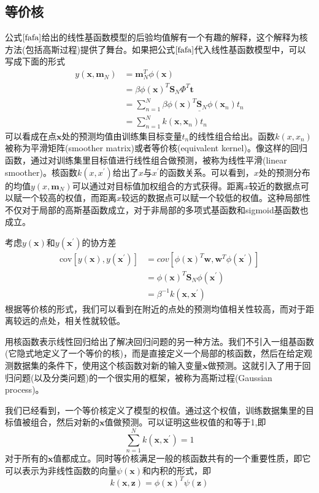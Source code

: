 \subsection*{等价核}
公式$\ref{fafa}$给出的线性基函数模型的后验均值解有一个有趣的解释，这个解释为核方法(包括高斯过程)提供了舞台。如果把公式$\ref{fafa}$代入线性基函数模型中，可以写成下面的形式
\begin{equation}
\begin{aligned}
	y(\boldsymbol{x},\boldsymbol{m}_N)&=\boldsymbol{m}_N^T\phi(\boldsymbol{x})\\
	&=\beta\phi(\boldsymbol{x})^T\boldsymbol{S}_N\Phi^T\boldsymbol{t}\\
	&=\sum_{n=1}^{N}\underline{\beta\phi(\boldsymbol{x})^T\boldsymbol{S}_N\phi(\boldsymbol{x}_n)}t_n\\
	&=\sum_{n=1}^{N}k(\boldsymbol{x},\boldsymbol{x}_n)t_n
\end{aligned}
\end{equation}
可以看成在点$\boldsymbol{x}$处的预测均值由训练集目标变量$t_n$的线性组合给出。函数$k(x,x_n)$被称为平滑矩阵(smoother matrix)或者等价核(equivalent kernel)。像这样的回归函数，通过对训练集里目标值进行线性组合做预测，被称为线性平滑(linear smoother)。核函数$k(x,x^{'})$给出了$x$与$x^{'}$的函数关系。可以看到，$x$处的预测分布的均值$y(x,\boldsymbol{m}_N)$可以通过对目标值加权组合的方式获得。距离$x$较近的数据点可以赋一个较高的权值，而距离$x$较远的数据点可以赋一个较低的权值。这种局部性不仅对于局部的高斯基函数成立，对于非局部的多项式基函数和sigmoid基函数也成立。

考虑$y(\boldsymbol{x})$和$y(\boldsymbol{x^{'}})$的协方差
\begin{equation}
	\begin{aligned}
	\mathrm{cov}[y(\boldsymbol{x}),y(\boldsymbol{x^{'}})]&=cov[\phi(\boldsymbol{x})^T\boldsymbol{w},\boldsymbol{w}^T\phi(\boldsymbol{x^{'}})]\\
	&=\phi(\boldsymbol{x})^T\boldsymbol{S}_N\phi(\boldsymbol{x^{'}})\\
	&=\beta^{-1}k(\boldsymbol{x},\boldsymbol{x^{'}})
	\end{aligned}
\end{equation}
根据等价核的形式，我们可以看到在附近的点处的预测均值相关性较高，而对于距离较远的点处，相关性就较低。

用核函数表示线性回归给出了解决回归问题的另一种方法。我们不引入一组基函数(它隐式地定义了一个等价的核)，而是直接定义一个局部的核函数，然后在给定观测数据集的条件下，使用这个核函数对新的输入变量$\boldsymbol{x}$做预测。这就引入了用于回归问题(以及分类问题)的一个很实用的框架，被称为高斯过程(Gaussian process)。

我们已经看到，一个等价核定义了模型的权值。通过这个权值，训练数据集里的目标值被组合，然后对新的$\boldsymbol{x}$值做预测。可以证明这些权值的和等于1,即
\begin{equation}
	\sum_{n=1}^{N}k(\boldsymbol{x},\boldsymbol{x}^{'})=1
\end{equation}
对于所有的$\boldsymbol{x}$值都成立。同时等价核满足一般的核函数共有的一个重要性质，即它可以表示为非线性函数的向量$\psi(\boldsymbol{x})$和内积的形式，即
\begin{equation}
	k(\boldsymbol{x},\boldsymbol{z})=\phi(\boldsymbol{x})^T\psi(\boldsymbol{z})
\end{equation}